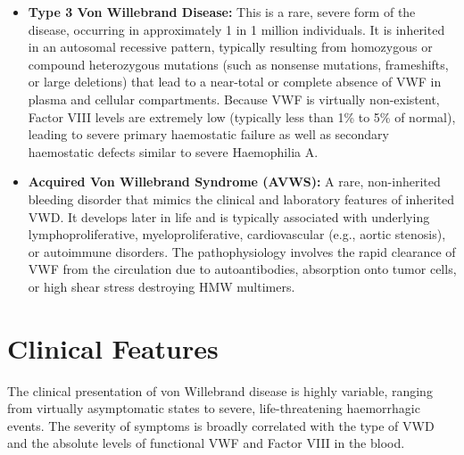 \begin{itemize}
\begin{itemize}
    \end{itemize}
    \item \textbf{Type 3 Von Willebrand Disease:} This is a rare, severe form of the disease, occurring in approximately 1 in 1 million individuals. It is inherited in an autosomal recessive pattern, typically resulting from homozygous or compound heterozygous mutations (such as nonsense mutations, frameshifts, or large deletions) that lead to a near-total or complete absence of VWF in plasma and cellular compartments. Because VWF is virtually non-existent, Factor VIII levels are extremely low (typically less than 1\% to 5\% of normal), leading to severe primary haemostatic failure as well as secondary haemostatic defects similar to severe Haemophilia A.
    \item \textbf{Acquired Von Willebrand Syndrome (AVWS):} A rare, non-inherited bleeding disorder that mimics the clinical and laboratory features of inherited VWD. It develops later in life and is typically associated with underlying lymphoproliferative, myeloproliferative, cardiovascular (e.g., aortic stenosis), or autoimmune disorders. The pathophysiology involves the rapid clearance of VWF from the circulation due to autoantibodies, absorption onto tumor cells, or high shear stress destroying HMW multimers.
\end{itemize}

\section*{Clinical Features}
The clinical presentation of von Willebrand disease is highly variable, ranging from virtually asymptomatic states to severe, life-threatening haemorrhagic events. The severity of symptoms is broadly correlated with the type of VWD and the absolute levels of functional VWF and Factor VIII in the blood.

